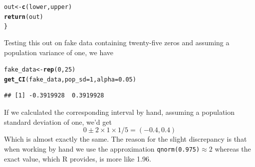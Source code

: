 \documentclass[addpoints,12pt]{exam}\usepackage[]{graphicx}\usepackage[]{xcolor}
\makeatletter
\newcommand{\hlnum}[1]{\textcolor[rgb]{0.686,0.059,0.569}{#1}}%
\newcommand{\hldef}[1]{\textcolor[rgb]{0.345,0.345,0.345}{#1}}%
\newcommand{\hlkwb}[1]{\textcolor[rgb]{0.69,0.353,0.396}{#1}}%
\newcommand{\hlkwc}[1]{\textcolor[rgb]{0.333,0.667,0.333}{#1}}%
\newcommand{\hlkwd}[1]{\textcolor[rgb]{0.737,0.353,0.396}{\textbf{#1}}}%
\newenvironment{kframe}{%
 \def\at@end@of@kframe{}%
 \ifinner\ifhmode%
  \def\at@end@of@kframe{\end{minipage}}%
  \begin{minipage}{\columnwidth}%
 \fi\fi%
 \def\FrameCommand##1{\hskip\@totalleftmargin \hskip-\fboxsep
 \colorbox{shadecolor}{##1}\hskip-\fboxsep
     \hskip-\linewidth \hskip-\@totalleftmargin \hskip\columnwidth}%
 \MakeFramed {\advance\hsize-\width
   \@totalleftmargin\z@ \linewidth\hsize
   \@setminipage}}%
 {\par\unskip\endMakeFramed%
 \at@end@of@kframe}
\newenvironment{knitrout}{}{} %
\makeatother
\begin{document}
\begin{questions}
\begin{parts}
\begin{solution}
\begin{knitrout}
\begin{kframe}
\begin{alltt}
  \hldef{out} \hlkwb{<-} \hlkwd{c}\hldef{(lower, upper)}
  \hlkwd{return}\hldef{(out)}
\hldef{\}}
\end{alltt}
\end{kframe}
\end{knitrout}
Testing this out on fake data containing twenty-five zeros and assuming a population variance of one, we have
\begin{knitrout}
\color{fgcolor}\begin{kframe}
\begin{alltt}
\hldef{fake_data} \hlkwb{<-} \hlkwd{rep}\hldef{(}\hlnum{0}\hldef{,} \hlnum{25}\hldef{)}
\hlkwd{get_CI}\hldef{(fake_data,} \hlkwc{pop_sd} \hldef{=} \hlnum{1}\hldef{,} \hlkwc{alpha} \hldef{=} \hlnum{0.05}\hldef{)}
\end{alltt}
\begin{verbatim}
## [1] -0.3919928  0.3919928
\end{verbatim}
\end{kframe}
\end{knitrout}
If we calculated the corresponding interval by hand, assuming a population standard deviation of one, we'd get
  $$0 \pm  2 \times 1 \times 1/5 = (-0.4, 0.4)$$
Which is almost exactly the same. The reason for the slight discrepancy is that when working by hand we use the approximation \texttt{qnorm(0.975)}$\approx 2$ whereas the exact value, which R provides, is more like 1.96.
\end{solution}

\end{parts}
\end{questions}
\end{document}
